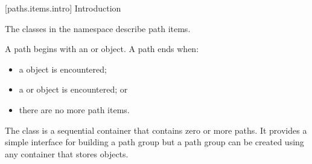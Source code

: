 
 [paths.items.intro] {Introduction}

\pnum
The classes in the  namespace describe path items.

\pnum
A path begins with an  or  object. A path ends when:

\begin{itemize}
\item a  object is encountered;
\item a  or  object is encountered; or
\item there are no more path items.
\end{itemize}

\pnum
The  class is a sequential container that contains zero or more paths. It provides a simple interface for building a path group but a path group can be created using any container that stores  objects.
